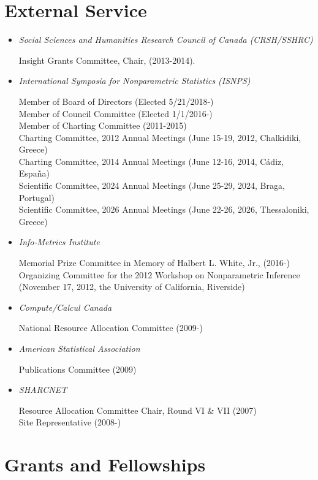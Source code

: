 \documentclass[
]{article}
\begin{document}
\section*{External Service}\label{external-service}

\begin{itemize}
\item
  \emph{Social Sciences and Humanities Research Council of Canada
  (CRSH/SSHRC)}

  Insight Grants Committee, Chair, (2013-2014).
\item
  \emph{International Symposia for Nonparametric Statistics (ISNPS)}

  Member of Board of Directors (Elected 5/21/2018-)\\
  Member of Council Committee (Elected 1/1/2016-)\\
  Member of Charting Committee (2011-2015)\\
  Charting Committee, 2012 Annual Meetings (June 15-19, 2012,
  Chalkidiki, Greece)\\
  Charting Committee, 2014 Annual Meetings (June 12-16, 2014, Cádiz,
  España)\\
  Scientific Committee, 2024 Annual Meetings (June 25-29, 2024, Braga,
  Portugal)\\
  Scientific Committee, 2026 Annual Meetings (June 22-26, 2026,
  Thessaloniki, Greece)
\item
  \emph{Info-Metrics Institute}

  Memorial Prize Committee in Memory of Halbert L. White, Jr., (2016-)\\
  Organizing Committee for the 2012 Workshop on Nonparametric Inference
  (November 17, 2012, the University of California, Riverside)
\item
  \emph{Compute/Calcul Canada}

  National Resource Allocation Committee (2009-)
\item
  \emph{American Statistical Association}

  Publications Committee (2009)
\item
  \emph{SHARCNET}

  Resource Allocation Committee Chair, Round VI \& VII (2007)\\
  Site Representative (2008-)\\
\end{itemize}

\section*{Grants and Fellowships}\label{grants-and-fellowships}
\end{document}

